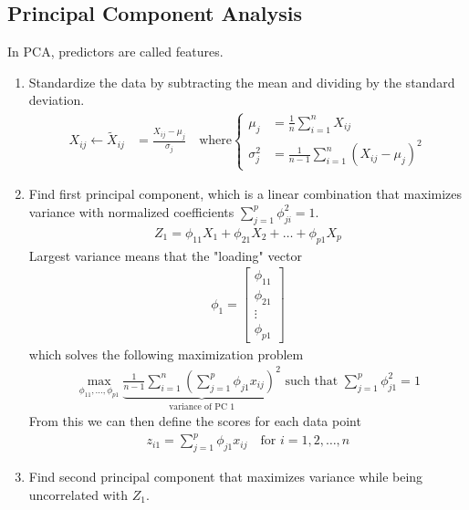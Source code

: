 \documentclass[12pt, letterpaper]{article}
\begin{document}
\subsection{Principal Component Analysis}
In PCA, predictors are called features.
\begin{enumerate}
    \item Standardize the data by subtracting the mean and dividing by the standard deviation.
    \begin{align*}
        X_{ij} \leftarrow \tilde X_{ij} &= \frac{X_{ij} - \mu_j}{\sigma_j} \quad \text{where}
        \begin{cases}
        \mu_j &= \frac 1n \sum_{i=1}^{n}X_{ij} \\
        \sigma_j^2 &= \frac{1}{n-1} \sum_{i=1}^{n}(X_{ij}-\mu_j)^2
        \end{cases}
    \end{align*}
    \item Find first principal component, which is a linear combination that maximizes variance
    with normalized coefficients $\sum_{j=1}^{p}\phi^2_{ji} = 1$.
    \begin{align*}
        Z_1 = \phi_{11} X_1 + \phi_{21} X_2 + \dots + \phi_{p1}X_p
    \end{align*}
    Largest variance means that the "loading" vector 
    \begin{align*}
       \phi_1 = \begin{bmatrix}
        \phi_{11} \\ \phi_{21} \\ \vdots \\ \phi_{p1}
        \end{bmatrix}
    \end{align*}
    which solves the following maximization problem
    \begin{align*}
    \max_{\phi_{11},\dots,\phi_{p1}} \underbrace{\frac{1}{n-1}\sum_{i=1}^{n}\left( \sum_{j=1}^{p} \phi_{j1}x_{ij}\right)^2}_{\text{variance of PC 1}}
    \text{ such that } \sum_{j=1}^{p}\phi_{j1}^2 = 1
    \end{align*}
    From this we can then define the scores for each data point
    \begin{align*}
        z_{i1} = \sum_{j=1}^{p}\phi_{j1}x_{ij} \quad \text{for } i = 1,2,\dots,n
    \end{align*}
    \item Find second principal component that maximizes variance while being uncorrelated with $Z_1$.
    \begin{align*}

\end{align*}
\end{enumerate}
\end{document}
